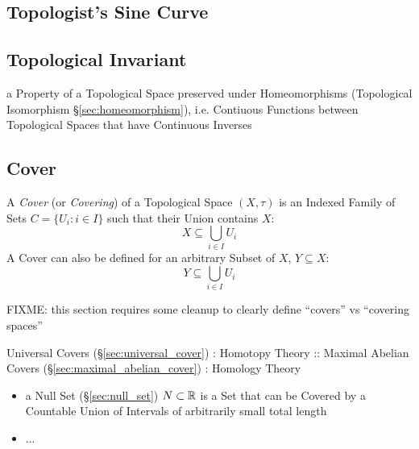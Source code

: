 \subsection{Topologist's Sine Curve}\label{sec:topologists_sine}

\subsection{Topological Invariant}\label{sec:topological_invariant}

a Property of a Topological Space preserved under Homeomorphisms
(Topological Isomorphism \S\ref{sec:homeomorphism}), i.e. Contiuous Functions
between Topological Spaces that have Continuous Inverses



\subsection{Cover}\label{sec:topological_cover}

A \emph{Cover} (or \emph{Covering}) of a Topological Space $(X, \tau)$
is an Indexed Family of Sets $C = \{ U_i : i \in I \}$ such that their
Union contains $X$:
\[
  X \subseteq \bigcup_{i \in I} U_i
\]
A Cover can also be defined for an arbitrary Subset of $X$, $Y
\subseteq X$:
\[
  Y \subseteq \bigcup_{i \in I} U_i
\]

FIXME: this section requires some cleanup to clearly define ``covers''
vs ``covering spaces''

Universal Covers (\S\ref{sec:universal_cover}) : Homotopy Theory ::
Maximal Abelian Covers (\S\ref{sec:maximal_abelian_cover}) : Homology
Theory

\begin{itemize}
  \item a Null Set (\S\ref{sec:null_set}) $N \subset \mathbb{R}$ is a Set that can
    be Covered by a Countable Union of Intervals of arbitrarily small total
    length
  \item ...
\end{itemize}



